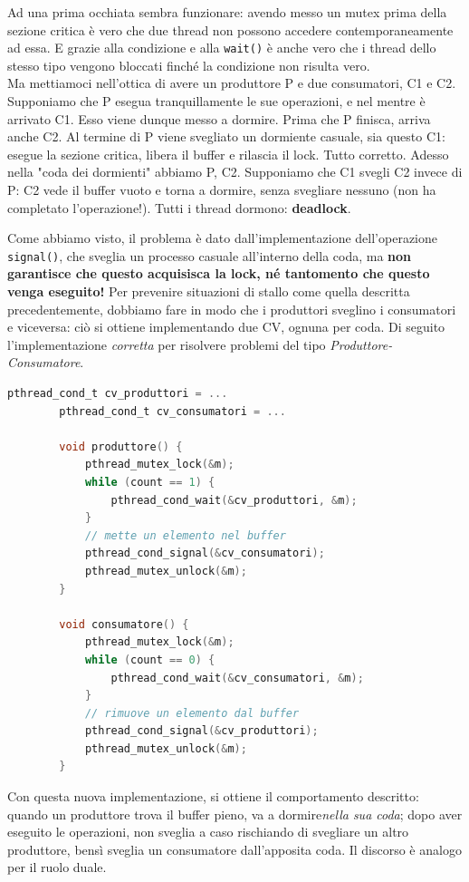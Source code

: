 \documentclass[12pt]{report}
\begin{document}
	Ad una prima occhiata sembra funzionare: avendo messo un mutex prima della sezione critica è vero che due thread non possono accedere contemporaneamente ad essa. E grazie alla condizione e alla \texttt{wait()} è anche vero che i thread dello stesso tipo vengono bloccati finché la condizione non risulta vero.\\
	Ma mettiamoci nell'ottica di avere un produttore P e due consumatori, C1 e C2. Supponiamo che P esegua tranquillamente le sue operazioni, e nel mentre è arrivato C1. Esso viene dunque messo a dormire. Prima che P finisca, arriva anche C2. Al termine di P viene svegliato un dormiente casuale, sia questo C1: esegue la sezione critica, libera il buffer e rilascia il lock. Tutto corretto. Adesso nella "coda dei dormienti" abbiamo P, C2. Supponiamo che C1 svegli C2 invece di P: C2 vede il buffer vuoto e torna a dormire, senza svegliare nessuno (non ha completato l'operazione!). Tutti i thread dormono: \textbf{deadlock}.
	\smallbreak
	
	Come abbiamo visto, il problema è dato dall'implementazione dell'operazione \texttt{signal()}, che sveglia un processo casuale all'interno della coda, ma \textbf{non garantisce che questo acquisisca la lock, né tantomento che questo venga eseguito!} Per prevenire situazioni di stallo come quella descritta precedentemente, dobbiamo fare in modo che i produttori sveglino i consumatori e viceversa: ciò si ottiene implementando due CV, ognuna per coda. Di seguito l'implementazione \textit{corretta} per risolvere problemi del tipo \textit{Produttore-Consumatore}.
	\begin{lstlisting}[language=C]
		pthread_cond_t cv_produttori = ...
		pthread_cond_t cv_consumatori = ...
		
		void produttore() {
			pthread_mutex_lock(&m);
			while (count == 1) {
				pthread_cond_wait(&cv_produttori, &m);
			}
			// mette un elemento nel buffer
			pthread_cond_signal(&cv_consumatori);
			pthread_mutex_unlock(&m);
		}
		
		void consumatore() {
			pthread_mutex_lock(&m);
			while (count == 0) {
				pthread_cond_wait(&cv_consumatori, &m);
			}
			// rimuove un elemento dal buffer
			pthread_cond_signal(&cv_produttori);
			pthread_mutex_unlock(&m);
		}
	\end{lstlisting}
	Con questa nuova implementazione, si ottiene il comportamento descritto: quando un produttore trova il buffer pieno, va a dormire\textit{nella sua coda}; dopo aver eseguito le operazioni, non sveglia a caso rischiando di svegliare un altro produttore, bensì sveglia un consumatore dall'apposita coda. Il discorso è analogo per il ruolo duale.
	
\end{document}
